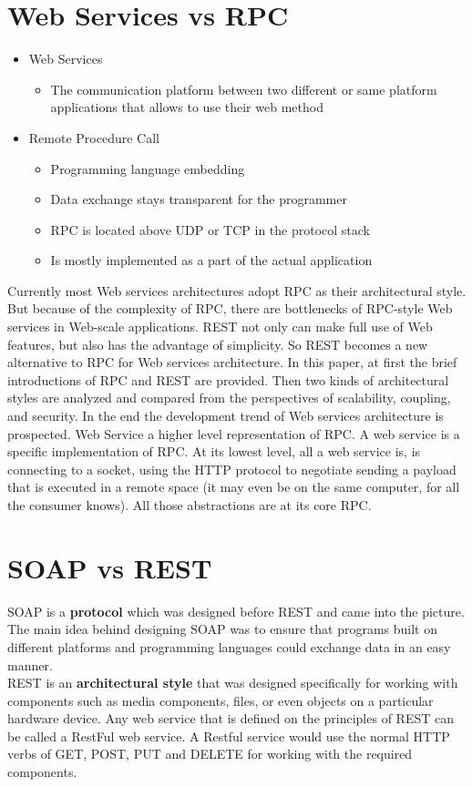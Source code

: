 \documentclass[11pt]{article}
\author{eo shiru}
\date{\today}
\title{}
\begin{document}
\tableofcontents

\section{Web Services vs RPC}
\label{sec:orgfebd4b1}
\begin{itemize}
\item Web Services
\begin{itemize}
\item The communication platform between two different or same platform applications that allows to use their web method
\end{itemize}
\item Remote Procedure Call
\begin{itemize}
\item Programming language embedding
\item Data exchange stays transparent for the programmer
\item RPC is located above UDP or TCP in the protocol stack
\item Is mostly implemented as a part of the actual application
\end{itemize}
\end{itemize}

Currently most Web services architectures adopt RPC as their architectural style. But because of the complexity of RPC, there are bottlenecks of RPC-style Web services in Web-scale applications. REST not only can make full use of Web features, but also has the advantage of simplicity. So REST becomes a new alternative to RPC for Web services architecture. In this paper, at first the brief introductions of RPC and REST are provided. Then two kinds of architectural styles are analyzed and compared from the perspectives of scalability, coupling, and security. In the end the development trend of Web services architecture is prospected.
Web Service a higher level representation of RPC. A web service is a specific implementation of RPC. At its lowest level, all a web service is, is connecting to a socket, using the HTTP protocol to negotiate sending a payload that is executed in a remote space (it may even be on the same computer, for all the consumer knows). All those abstractions are at its core RPC.
\section{SOAP vs REST}
\label{sec:org855456c}
SOAP is a \textbf{protocol} which was designed before REST and came into the picture. The main idea behind designing SOAP was to ensure that programs built on different platforms and programming languages could exchange data in an easy manner.\\
REST is an \textbf{architectural style} that was designed specifically for working with components such as media components, files, or even objects on a particular hardware device. Any web service that is defined on the principles of REST can be called a RestFul web service. A Restful service would use the normal HTTP verbs of GET, POST, PUT and DELETE for working with the required components.
\end{document}
